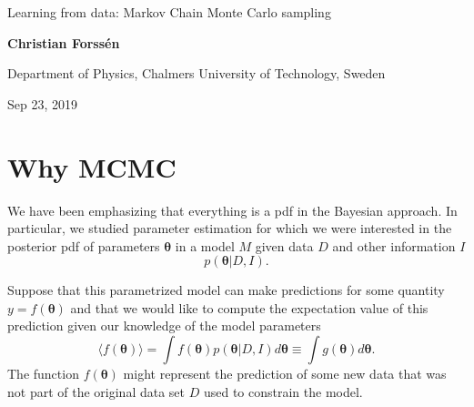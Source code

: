 \documentclass[%
oneside,                 %
final,                   %
10pt]{article}
\begin{document}

\newcommand{\exercisesection}[1]{\subsection*{#1}}







\thispagestyle{empty}

\begin{center}
{\LARGE\bf
\begin{spacing}{1.25}
Learning from data: Markov Chain Monte Carlo sampling 
\end{spacing}
}
\end{center}


\begin{center}
{\bf Christian Forssén}
\end{center}

    \begin{center}
\centerline{{\small Department of Physics, Chalmers University of Technology, Sweden}}
\end{center}
    

\begin{center}
Sep 23, 2019
\end{center}

\vspace{1cm}


\section{Why MCMC}
We have been emphasizing that everything is a pdf in the Bayesian approach. In particular, we studied parameter estimation for which we were interested in the posterior pdf of parameters $\boldsymbol{\theta}$ in a model $M$ given data $D$ and other information $I$
\[
p(\boldsymbol{\theta} | D, I).
\]

Suppose that this parametrized model can make predictions for some quantity $y = f(\boldsymbol{\theta})$ and that we would like to compute the expectation value of this prediction given our knowledge of the model parameters
\[
\langle f(\boldsymbol{\theta}) \rangle = \int f(\boldsymbol{\theta}) p(\boldsymbol{\theta} | D,I) d \boldsymbol{\theta} \equiv \int g( \boldsymbol{\theta} ) d\boldsymbol{\theta}.
\]
The function $f(\boldsymbol{\theta})$ might represent the prediction of some new data that was not part of the original data set $D$ used to constrain the model.
\end{document}

